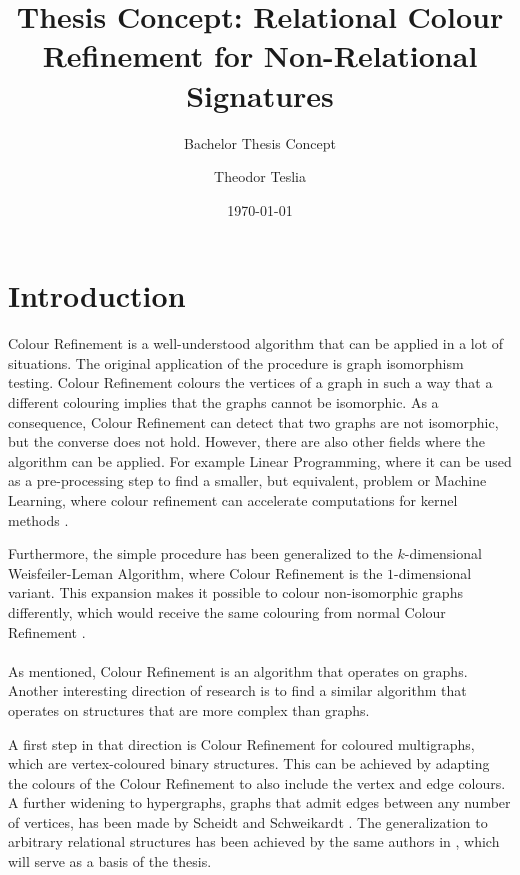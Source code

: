 \documentclass[a4paper,11pt,DIV=15]{scrartcl} %
\theoremstyle{plain}
\theoremstyle{definition}
\begin{document}
\subtitle{Bachelor Thesis Concept}
\date{\today}
\publishers{RWTH Aachen University}	%

\title{Thesis Concept: Relational Colour Refinement for Non-Relational Signatures}

\author{Theodor Teslia}

\maketitle

\section{Introduction}

Colour Refinement is a well-understood algorithm that can be applied in a lot of situations.
The original application of the procedure is graph isomorphism testing.
Colour Refinement colours the vertices of a graph in such a way that a different colouring implies that the graphs cannot be isomorphic.
As a consequence, Colour Refinement can detect that two graphs are not isomorphic, but the converse does not hold.
However, there are also other fields where the algorithm can be applied.
For example Linear Programming, where it can be used as a pre-processing step to find a smaller, but equivalent, problem or Machine Learning, where colour refinement can accelerate computations for kernel methods \cite{grohe2021color}.

Furthermore, the simple procedure has been generalized to the $k$-dimensional Weisfeiler-Leman Algorithm, where Colour Refinement is the $1$-dimensional variant.
This expansion makes it possible to colour non-isomorphic graphs differently, which would receive the same colouring from normal Colour Refinement \cite{kiefer2020power}.
\\ \\
As mentioned, Colour Refinement is an algorithm that operates on graphs.
Another interesting direction of research is to find a similar algorithm that operates on structures that are more complex than graphs.

A first step in that direction is Colour Refinement for coloured multigraphs, which are vertex-coloured binary structures. 
This can be achieved by adapting the colours of the Colour Refinement to also include the vertex and edge colours. \cite{scheidt2024color}
A further widening to hypergraphs, graphs that admit edges between any number of vertices, has been made by Scheidt and Schweikardt \cite{scheidt2023counting}.
The generalization to arbitrary relational structures has been achieved by the same authors in \cite{scheidt2024color}, which will serve as a basis of the thesis.
\end{document}
